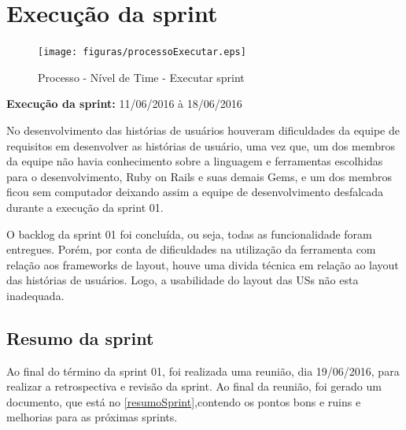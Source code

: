 \section{Execução da sprint}

\begin{figure}[H]
    \centering
    \label{identificarExecutar}
    \texttt{[image: figuras/processoExecutar.eps]}
    \caption[Executar sprint]{Processo - Nível de Time - Executar sprint}
\end{figure}

\textbf{Execução da sprint:} 11/06/2016 à 18/06/2016

No desenvolvimento das histórias de usuários houveram dificuldades da equipe de requisitos em desenvolver as histórias de usuário, uma vez que, um dos membros da equipe não havia conhecimento sobre a linguagem e ferramentas escolhidas para o desenvolvimento, Ruby on Rails e suas demais Gems, e um dos membros ficou sem computador deixando assim a equipe de desenvolvimento desfalcada durante a execução da sprint 01.

O backlog da sprint 01 foi concluída, ou seja, todas as funcionalidade foram entregues. Porém, por conta de dificuldades na utilização da ferramenta com relação aos frameworks de layout, houve uma divida técnica em relação ao layout das histórias de usuários. Logo, a usabilidade do layout das USs não esta inadequada.

\subsection{Resumo da sprint}

Ao final do término da sprint 01, foi realizada uma reunião, dia 19/06/2016, para realizar a retrospectiva e revisão da sprint. Ao final da reunião, foi gerado um documento, que está no \autoref{resumoSprint},contendo os pontos bons e ruins e melhorias para as próximas sprints.

